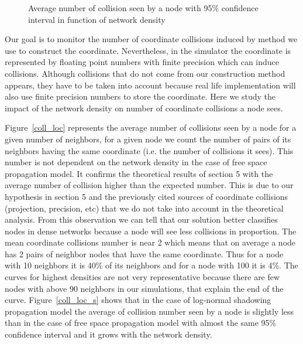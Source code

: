 \documentclass[a4paper]{article}
\begin{document}
\begin{figure}[!h]

    \hfil
\caption{Average number of collision seen by a node with 95\% confidence interval in function of network density}
\end{figure}

Our goal is to monitor the number of coordinate collisions induced by method we use to construct the coordinate. Nevertheless, in the simulator the coordinate is represented by floating point numbers with finite precision which can induce collisions. Although collisions that do not come from our construction method appears, they have to be taken into account because real life implementation will also use finite precision numbers to store the coordinate. Here we study the impact of the network density on number of coordinate collisions a node sees.

Figure~\ref{coll_loc} represents the average number of collisions seen by a node for a given number of neighbors, for a given node we count the number of pairs of its neighbors having the same coordinate (i.e. the number of collisions it sees). This number is not dependent on the network density in the case of free space propagation model. It confirms the theoretical results of section 5 with the average number of collision higher than the expected number. This is due to our hypothesis in section 5 and the previously cited sources of coordinate collisions (projection, precision, etc) that we do not take into account in the theoretical analysis. From this observation we can tell that our solution better classifies nodes in dense networks because a node will see less collisions in proportion. The mean coordinate collisions number is near 2 which means that on average a node has 2 pairs of neighbor nodes that have the same coordinate. Thus for a node with 10 neighbors it is 40\% of its neighbors and for a node with 100 it is 4\%. The curves for highest densities are not very representative because there are few nodes with above 90 neighbors in our simulations, that explain the end of the curve. Figure~\ref{coll_loc_s} shows that in the case of log-normal shadowing propagation model the average of collision number seen by a node is slightly less than in the case of free space propagation model with almost the same 95\% confidence interval and it grows with the network density.
\end{document}
